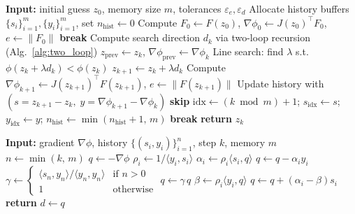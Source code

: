 \documentclass[11pt,a4paper]{article}
\begin{document}
\begin{algorithm}[H]
\caption{L-BFGS for $\min_z \frac{1}{2}\|F(z)\|^2$}
\label{alg:lbfgs}
\begin{algorithmic}[1]
\State \textbf{Input:} initial guess $z_0$, memory size $m$, tolerances $\varepsilon_e, \varepsilon_d$
\State Allocate history buffers $\{s_i\}_{i=1}^m, \{y_i\}_{i=1}^m$, set $n_{\text{hist}} \gets 0$
\State Compute $F_0 \gets F(z_0)$, $\nabla\phi_0 \gets J(z_0)^\top F_0$, $e \gets \|F_0\|$
     \State \textbf{break} \EndIf
    \State Compute search direction $d_k$ via two-loop recursion (Alg.~\ref{alg:two_loop})
    \State $z_{\text{prev}} \gets z_k$, \; $\nabla\phi_{\text{prev}} \gets \nabla\phi_k$
    \State Line search: find $\lambda$ s.t.\ $\phi(z_k + \lambda d_k) < \phi(z_k)$
    \State $z_{k+1} \gets z_k + \lambda d_k$
    \State Compute $\nabla\phi_{k+1} \gets J(z_{k+1})^\top F(z_{k+1})$, \; $e \gets \|F(z_{k+1})\|$
    \State Update history with $(s = z_{k+1}-z_k,\; y = \nabla\phi_{k+1}-\nabla\phi_k)$
      \State \textbf{skip}
    \EndIf
    \State $\text{idx} \gets (k \bmod m) + 1$; \; $s_{\text{idx}} \gets s$; \; $y_{\text{idx}} \gets y$;
          \; $n_{\text{hist}} \gets \min(n_{\text{hist}}+1,\, m)$
     \State \textbf{break} \EndIf
\EndFor
\State \textbf{return} $z_k$
\end{algorithmic}
\end{algorithm}

\begin{algorithm}[H]
\caption{L-BFGS two-loop recursion --- computes $d = -H_k^{-1}\nabla\phi$}
\label{alg:two_loop}
\begin{algorithmic}[1]
\State \textbf{Input:} gradient $\nabla\phi$, history $\{(s_i,y_i)\}_{i=1}^{n}$, step $k$, memory $m$
\State $n \gets \min(k,\, m)$ 
\State $q \gets -\nabla\phi$
 
    \State $\rho_i \gets 1 / \langle y_i, s_i \rangle$
    \State $\alpha_i \gets \rho_i \langle s_i, q \rangle$
    \State $q \gets q - \alpha_i y_i$
\EndFor
\State $\gamma \gets \begin{cases}
      \langle s_n, y_n \rangle / \langle y_n, y_n \rangle & \text{if } n > 0 \\
      1 & \text{otherwise}
    \end{cases}$ 
\State $q \gets \gamma\, q$
 
    \State $\beta \gets \rho_i \langle y_i, q \rangle$
    \State $q \gets q + (\alpha_i - \beta) s_i$
\EndFor
\State \textbf{return} $d \gets q$
\end{algorithmic}
\end{algorithm}
\end{document}
